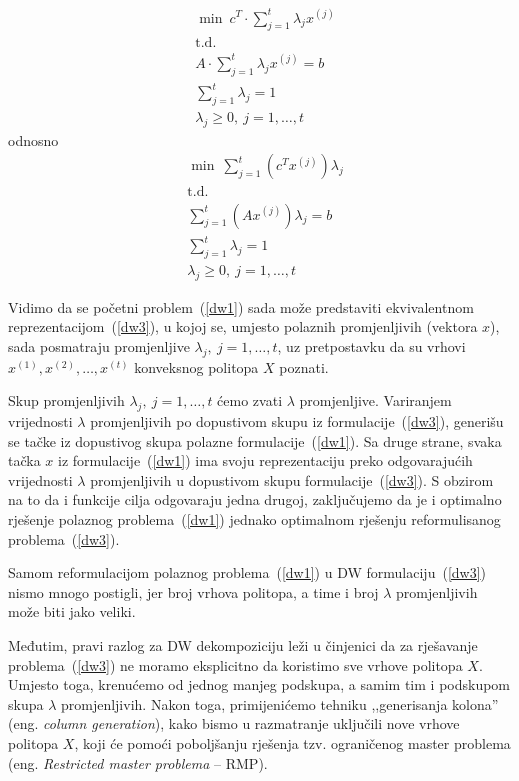 \documentclass[a4paper, utf8, 11pt, colorlinks]{book}
\theoremstyle{definition}
\begin{document}
 
   \begin{equation}
 	\begin{aligned}\label{dw2}
 	&	\min\  c^T\cdot \sum_{j=1}^t\lambda_jx^{(j)}\\
 		&\mbox{t.d.}\\  
 		&A\cdot \sum_{j=1}^t\lambda_jx^{(j)}=b\\
 		 		 &\sum_{j=1}^t\lambda_j = 1\\
 		&\lambda_j\geqslant 0,\ j = 1,\ldots,t
 	\end{aligned}
 \end{equation}
odnosno
    \begin{equation}
 	\begin{aligned}\label{dw3}
 		&\min\  \sum_{j=1}^t(c^T x^{(j)})\lambda_j\\
 			&\mbox{t.d.}\\   
 		&\sum_{j=1}^t (A x^{(j)})\lambda_j=b\\
 		&\sum_{j=1}^t\lambda_j = 1\\
 		&\lambda_j\geqslant 0,\ j = 1,\ldots,t
 	\end{aligned}
 \end{equation}
 
 Vidimo da se početni problem~(\ref{dw1}) sada može predstaviti ekvivalentnom reprezentacijom~(\ref{dw3}), u kojoj se, umjesto polaznih promjenljivih (vektora $x$), sada posmatraju promjenljive $\lambda_j,\ j = 1,\ldots,t$, uz pretpostavku da su  vrhovi $x^{(1)},x^{(2)},\dots,x^{(t)}$ konveksnog politopa $X$ poznati.
 
 Skup promjenljivih $\lambda_j,\ j = 1,\ldots,t$ ćemo zvati $\lambda$ promjenljive.
  Variranjem vrijednosti $\lambda$ promjenljivih po dopustivom skupu iz formulacije~(\ref{dw3}), generišu se tačke iz dopustivog skupa polazne formulacije~(\ref{dw1}). Sa druge strane, svaka tačka $x$ iz formulacije~(\ref{dw1}) ima svoju reprezentaciju preko odgovarajućih vrijednosti  $\lambda$ promjenljivih u dopustivom skupu formulacije~(\ref{dw3}). S obzirom na to da i funkcije cilja odgovaraju jedna drugoj, zaključujemo da je i optimalno rješenje polaznog problema~(\ref{dw1}) jednako optimalnom rješenju reformulisanog problema~(\ref{dw3}).
 
 Samom reformulacijom polaznog problema~(\ref{dw1}) u DW formulaciju~(\ref{dw3}) nismo mnogo postigli, jer broj vrhova politopa, a time i broj $\lambda$ promjenljivih može biti jako veliki.
 
 Međutim, pravi razlog za DW dekompoziciju leži u činjenici da za rješavanje problema~(\ref{dw3}) ne moramo eksplicitno da koristimo sve vrhove politopa $X$. Umjesto toga, krenućemo od jednog   manjeg podskupa, a samim tim i podskupom skupa $\lambda$ promjenljivih. Nakon toga, primijenićemo tehniku ,,generisanja kolona'' (eng. \emph{column generation}), kako bismo u razmatranje uključili nove vrhove politopa $X$, koji će pomoći poboljšanju rješenja tzv. ograničenog master problema (eng. \emph{Restricted master problema} -- RMP).
 
\end{document}
